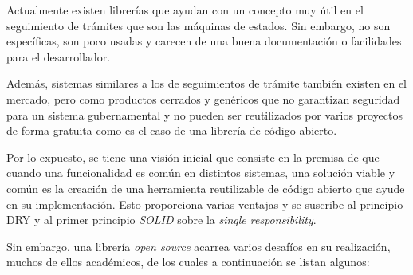 Actualmente existen librerías que ayudan con un concepto muy útil en el
seguimiento de trámites que son las máquinas de estados. Sin embargo, no son
específicas, son poco usadas y carecen de una buena documentación o facilidades
para el desarrollador.

Además, sistemas similares a los de seguimientos de trámite también existen en
el mercado, pero como productos cerrados y genéricos que no garantizan seguridad
para un sistema gubernamental y no pueden ser reutilizados por varios proyectos
de forma gratuita como es el caso de una librería de código abierto.

Por lo expuesto, se tiene una visión inicial que consiste en la premisa de que
cuando una funcionalidad es común en distintos sistemas, una solución viable y
común es la creación de una herramienta reutilizable de código abierto que ayude
en su implementación. Esto proporciona varias ventajas y se suscribe al
principio DRY  y al primer principio \textit{SOLID}
sobre la \textit{single responsibility}.

Sin embargo, una librería \textit{open source} acarrea varios desafíos en su realización,
muchos de ellos académicos, de los cuales a continuación se listan algunos:

